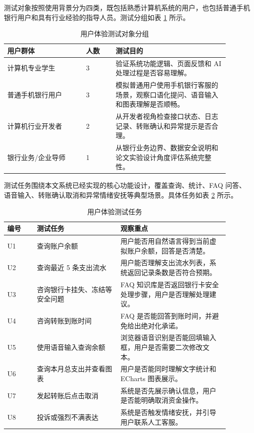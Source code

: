 \documentclass[bachelor, print]{xduthesis}
\begin{document}
测试对象按照使用背景分为四类，既包括熟悉计算机系统的用户，也包括普通手机银行用户和具有行业经验的指导人员。测试分组如表 \ref{tab:user-experience-group} 所示。

\begin{table}[H]
    \centering
    \caption{用户体验测试对象分组}
    \label{tab:user-experience-group}
    \small
    \setlength{\tabcolsep}{4pt}
    \begin{tabular}{|p{0.32\linewidth}|p{0.12\linewidth}|p{0.46\linewidth}|}
        \hline
        用户群体 & 人数 & 测试目的 \\
        \hline
        计算机专业学生 & 3 & 验证系统功能逻辑、页面反馈和 AI 处理过程是否容易理解。 \\
        \hline
        普通手机银行用户 & 3 & 模拟普通用户使用手机银行客服的场景，观察口语化提问、语音输入和图表理解是否顺畅。 \\
        \hline
        计算机行业开发者 & 2 & 从开发者视角检查接口状态、日志记录、转账确认和异常提示是否合理。 \\
        \hline
        银行业务/企业导师 & 1 & 从银行业务边界、数据安全说明和论文实验设计角度评估系统完整性。 \\
        \hline
    \end{tabular}
\end{table}

测试任务围绕本文系统已经实现的核心功能设计，覆盖查询、统计、FAQ 问答、语音输入、转账确认取消和异常情绪安抚等典型场景。具体任务如表 \ref{tab:user-experience-task} 所示。

\begin{table}[H]
    \centering
    \caption{用户体验测试任务}
    \label{tab:user-experience-task}
    \small
    \setlength{\tabcolsep}{4pt}
    \begin{tabular}{|p{0.12\linewidth}|p{0.34\linewidth}|p{0.44\linewidth}|}
        \hline
        编号 & 测试任务 & 观察重点 \\
        \hline
        U1 & 查询账户余额 & 用户能否用自然语言得到当前虚拟账户余额，回答是否清楚。 \\
        \hline
        U2 & 查询最近 5 条支出流水 & 用户能否理解支出流水列表，系统返回记录条数是否符合预期。 \\
        \hline
        U3 & 咨询银行卡挂失、冻结等安全问题 & FAQ 知识库是否返回银行卡安全处理步骤，用户是否理解处理建议。 \\
        \hline
        U4 & 咨询转账到账时间 & FAQ 是否能回答到账时间，并避免给出绝对化承诺。 \\
        \hline
        U5 & 使用语音输入查询余额 & 浏览器语音识别是否能回填输入框，用户是否需要二次修改文本。 \\
        \hline
        U6 & 查询本月总支出并查看图表 & 用户是否能同时理解文字统计和 ECharts 图表展示。 \\
        \hline
        U7 & 发起转账后点击取消 & 系统是否先展示确认信息，用户是否能明确取消资金操作。 \\
        \hline
        U8 & 投诉或强烈不满表达 & 系统是否触发情绪安抚，并引导用户联系人工客服。 \\
        \hline
    \end{tabular}
\end{table}
\end{document}
